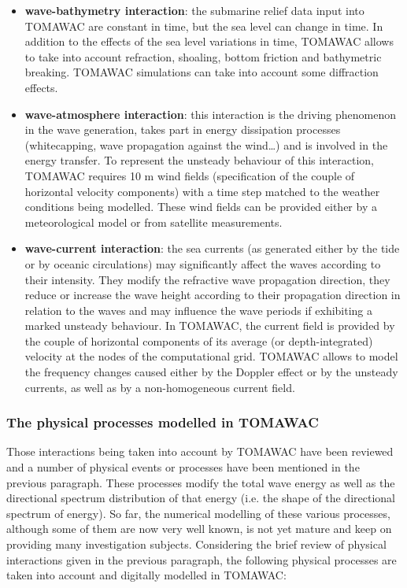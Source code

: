 \begin{itemize}

\item {\bf wave-bathymetry interaction}: the submarine relief data input into TOMAWAC are constant in time, but the sea level can change in time. In addition to the effects of the sea level variations in time, TOMAWAC allows to take into account refraction, shoaling, bottom friction and bathymetric breaking. TOMAWAC simulations can take into account some diffraction effects.
\item {\bf wave-atmosphere interaction}: this interaction is the driving phenomenon in the wave generation, takes part in energy dissipation processes (whitecapping, wave propagation against the wind…) and is involved in the energy transfer. To represent the unsteady behaviour of this interaction, TOMAWAC requires 10 m wind fields (specification of the couple of horizontal velocity components) with a time step matched to the weather conditions being modelled. These wind fields can be provided either by a meteorological model or from satellite measurements.
\item {\bf wave-current interaction}: the sea currents (as generated either by the tide or by oceanic circulations) may significantly affect the waves according to their intensity. They modify the refractive wave propagation direction, they reduce or increase the wave height according to their propagation direction in relation to the waves and may influence the wave periods if exhibiting a marked unsteady behaviour. In TOMAWAC, the current field is provided by the couple of horizontal components of its average (or depth-integrated) velocity at the nodes of the computational grid. TOMAWAC allows to model the frequency changes caused either by the Doppler effect or by the unsteady currents, as well as by a non-homogeneous current field.
\end{itemize}
\subsubsection{ The physical processes modelled in TOMAWAC}
Those interactions being taken into account by TOMAWAC have been reviewed and a number of physical events or processes have been mentioned in the previous paragraph. These processes modify the total wave energy as well as the directional spectrum distribution of that energy (i.e. the shape of the directional spectrum of energy). So far, the numerical modelling of these various processes, although some of them are now very well known, is not yet mature and keep on providing many investigation subjects. Considering the brief review of physical interactions given in the previous paragraph, the following physical processes are taken into account and digitally modelled in TOMAWAC:

